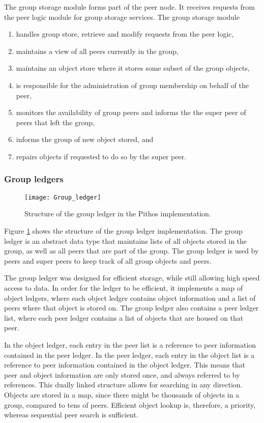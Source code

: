 The group storage module forms part of the peer node. It receives requests from the peer logic module for group storage services. The group storage module
\begin{enumerate}
  \item handles group store, retrieve and modify requests from the peer logic,
  \item maintains a view of all peers currently in the group,
  \item maintains an object store where it stores some subset of the group objects,
  \item is responsible for the administration of group membership on behalf of the peer,
  \item monitors the availability of group peers and informs the the super peer of peers that left the group,
  \item informs the group of new object stored, and
  \item repairs objects if requested to do so by the super peer.
\end{enumerate}

\subsubsection{Group ledgers}
\label{pithos_module_types_ledgers}

\begin{figure}[htbp]
 \centering
 \texttt{[image: Group\_ledger]}
 \caption{Structure of the group ledger in the Pithos implementation.}
 \label{fig_group_ledger}
\end{figure}
%
Figure \ref{fig_group_ledger} shows the structure of the group ledger implementation. The group ledger is an abstract data type that maintains lists of all objects stored in the group, as well as all peers that are part of the group. The group ledger is used by peers and super peers to keep track of all group objects and peers.

The group ledger was designed for efficient storage, while still allowing high speed access to data. In order for the ledger to be efficient, it implements a map of object ledgers, where each object ledger contains object information and a list of peers where that object is stored on. The group ledger also contains a peer ledger list, where each peer ledger contains a list of objects that are housed on that peer.

In the object ledger, each entry in the peer list is a reference to peer information contained in the peer ledger. In the peer ledger, each entry in the object list is a reference to peer information contained in the object ledger. This means that peer and object information are only stored once, and always referred to by references. This dually linked structure allows for searching in any direction. Objects are stored in a map, since there might be thousands of objects in a group, compared to tens of peers. Efficient object lookup is, therefore, a priority, whereas sequential peer search is sufficient.

